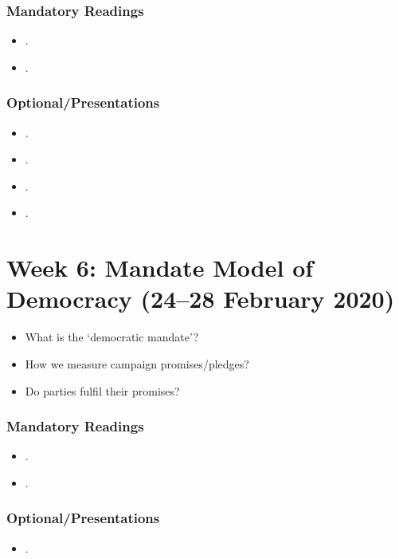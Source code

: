 \documentclass[abstract=on,parskip=full,headings=standardclasses,fontsize=11pt,paper=a4]{scrartcl}
\begin{document}
\subsubsection*{Mandatory Readings}
\begin{itemize}
\item {}.
\item {}.
\end{itemize}

\subsubsection*{Optional/Presentations}
\begin{itemize}
\item {}.
\item {}.
\item {}.
\item {}.
\end{itemize}


\section{Week 6:  Mandate Model of Democracy (24--28 February 2020)}


\begin{itemize}
\renewcommand\labelitemi{--}
\item What is the `democratic mandate'? 
\item How we measure campaign promises/pledges?
\item Do parties fulfil their promises?
\end{itemize}

\subsubsection*{Mandatory Readings}
\begin{itemize}
\item {}.
\item {}.
\end{itemize}

\subsubsection*{Optional/Presentations}
\begin{itemize}
\item {}.
\end{itemize}
\end{document}

